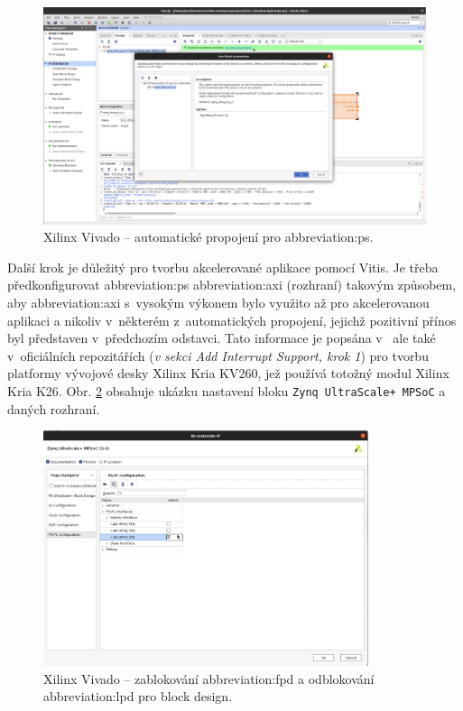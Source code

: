 \documentclass[a4paper, twoside, 11pt]{article}
\newcommand{\fbar}{\FloatBarrier}
\begin{document}
				\begin{figure}[htbp!]
					\centering
					\includegraphics[width=1\textwidth]{src/png/kr26-xilinx-vivado-flow/kr26-xilix-vivado-flow-05.jpg}
					\caption{Xilinx Vivado – automatické propojení pro \gls{abbreviation:ps}.}
					\label{fig:kr26-xilix-vivado-flow-05}
				\end{figure}
				\fbar

				Další krok je důležitý pro tvorbu akcelerované aplikace pomocí Vitis. Je třeba předkonfigurovat \gls{abbreviation:ps} \gls{abbreviation:axi} (rozhraní) takovým způsobem, aby \gls{abbreviation:axi} s~vysokým výkonem bylo využito až pro akcelerovanou aplikaci a nikoliv v~některém z~automatických propojení, jejichž pozitivní přínos byl představen v~předchozím odstavci. Tato informace je popsána v~\cite{hackster-getting-started-with-the-kria-kr260-in-vivado} ale také v~oficiálních repozitářích \cite{xilinx-github-vitis-tutorials-step-1-create-the-vivado-hardware-design-and-generate-xsa} (\textit{v sekci Add Interrupt Support, krok 1}) pro tvorbu platformy vývojové desky Xilinx Kria KV260, jež používá totožný modul Xilinx Kria K26. Obr. \ref{fig:kr26-xilix-vivado-flow-06} obsahuje ukázku nastavení bloku \texttt{Zynq UltraScale+ MPSoC} a daných rozhraní.

				\begin{figure}[htbp!]
					\centering
					\includegraphics[width=0.85\textwidth]{src/png/kr26-xilinx-vivado-flow/kr26-xilix-vivado-flow-06.jpg}
					\caption{Xilinx Vivado – zablokování \gls{abbreviation:fpd} a odblokování \gls{abbreviation:lpd} pro block design.}
					\label{fig:kr26-xilix-vivado-flow-06}
				\end{figure}
\end{document}
